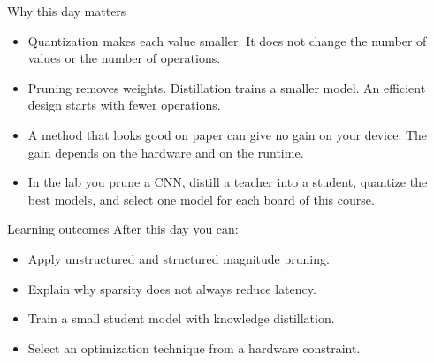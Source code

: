 \begin{frame}{Why this day matters}
  \begin{itemize}
    \item Quantization makes each value smaller. It does not change the number
          of values or the number of operations.
    \item Pruning removes weights. Distillation trains a smaller model. An
          efficient design starts with fewer operations.
    \item A method that looks good on paper can give no gain on your device.
          The gain depends on the hardware and on the runtime.
    \item In the lab you prune a CNN, distill a teacher into a student,
          quantize the best models, and select one model for each board of
          this course.
  \end{itemize}
\end{frame}

\begin{frame}{Learning outcomes}
  After this day you can:
  \begin{itemize}
    \item Apply unstructured and structured magnitude pruning.
    \item Explain why sparsity does not always reduce latency.
    \item Train a small student model with knowledge distillation.
    \item Select an optimization technique from a hardware constraint.
  \end{itemize}
\end{frame}
